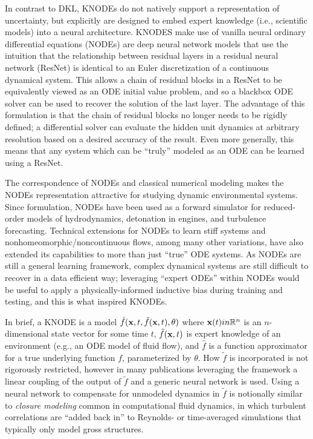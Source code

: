 In contrast to DKL, KNODEs do not natively support a representation of uncertainty, but explicitly are designed to embed expert knowledge (i.e., scientific models) into a neural architecture. KNODES make use of vanilla neural ordinary differential equations\autocite{chen2018neural} (NODEs) are deep neural network models that use the intuition that the relationship between residual layers in a residual neural network (ResNet) is identical to an Euler discretization of a continuous dynamical system. This allows a chain of residual blocks in a ResNet to be equivalently viewed as an ODE initial value problem, and so a blackbox ODE solver can be used to recover the solution of the last layer. The advantage of this formulation is that the chain of residual blocks no longer needs to be rigidly defined; a differential solver can evaluate the hidden unit dynamics at arbitrary resolution based on a desired accuracy of the result. Even more generally, this means that any system which can be ``truly'' modeled as an ODE can be learned using a ResNet.

The correspondence of NODEs and classical numerical modeling makes the NODEs representation attractive for studying dynamic environmental systems. Since formulation, NODEs have been used as a forward simulator for reduced-order models of hydrodynamics\autocite{dutta2021data}, detonation in engines\autocite{koch2021data}, and turbulence forecasting\autocite{portwood2019turbulence,shankar2020learning}. Technical extensions for NODEs to learn stiff systems\autocite{kim2021stiff} and nonhomeomorphic/noncontinuous flows\autocite{dupont2019augmented}, among many other variations, have also extended its capabilities to more than just ``true'' ODE systems. As NODEs are still a general learning framework, complex dynamical systems are still difficult to recover in a data efficient way; leveraging ``expert ODEs'' within NODEs would be useful to apply a physically-informed inductive bias during training and testing, and this is what inspired KNODEs.

In brief, a KNODE is a model $\hat{f}(\mathbf{x}, t, \tilde{f}(\mathbf{x}, t), \theta)$ where $\mathbf{x}(t) in \mathbb{R}^n$ is an $n$-dimensional state vector for some time $t$, $\tilde{f}(\mathbf{x}, t)$ is expert knowledge of an environment (e.g., an ODE model of fluid flow), and $\hat{f}$ is a function approximator for a true underlying function $f$, parameterized by $\theta$. How $\tilde{f}$ is incorporated is not rigorously restricted, however in many publications leveraging the framework a linear coupling of the output of $\tilde{f}$ and a generic neural network is used. Using a neural network to compensate for unmodeled dynamics in $\tilde{f}$ is notionally similar to \emph{closure modeling} common in computational fluid dynamics, in which turbulent correlations are ``added back in'' to Reynolds- or time-averaged simulations that typically only model gross structures\autocite{durbin2018some}.


